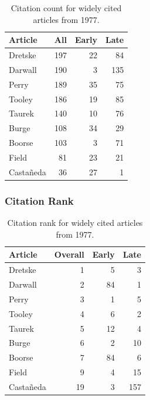 \documentclass[
  10pt,
  letterpaper,
  DIV=11,
  numbers=noendperiod,
  twoside]{scrartcl}
\begin{document}
\begin{longtable}[]{@{}lrrr@{}}

\caption{\label{tbl-citation-count-1977}Citation count for widely cited
articles from 1977.}

\tabularnewline

\toprule\noalign{}
Article & All & Early & Late \\
\midrule\noalign{}
\endhead
\bottomrule\noalign{}
\endlastfoot
Dretske & 197 & 22 & 84 \\
Darwall & 190 & 3 & 135 \\
Perry & 189 & 35 & 75 \\
Tooley & 186 & 19 & 85 \\
Taurek & 140 & 10 & 76 \\
Burge & 108 & 34 & 29 \\
Boorse & 103 & 3 & 71 \\
Field & 81 & 23 & 21 \\
Castañeda & 36 & 27 & 1 \\

\end{longtable}

\subsubsection*{Citation Rank}\label{sec-rank-1977}

\begin{longtable}[]{@{}lrrr@{}}

\caption{\label{tbl-citation-rank-1977}Citation rank for widely cited
articles from 1977.}

\tabularnewline

\toprule\noalign{}
Article & Overall & Early & Late \\
\midrule\noalign{}
\endhead
\bottomrule\noalign{}
\endlastfoot
Dretske & 1 & 5 & 3 \\
Darwall & 2 & 84 & 1 \\
Perry & 3 & 1 & 5 \\
Tooley & 4 & 6 & 2 \\
Taurek & 5 & 12 & 4 \\
Burge & 6 & 2 & 10 \\
Boorse & 7 & 84 & 6 \\
Field & 9 & 4 & 15 \\
Castañeda & 19 & 3 & 157 \\

\end{longtable}
\end{document}

